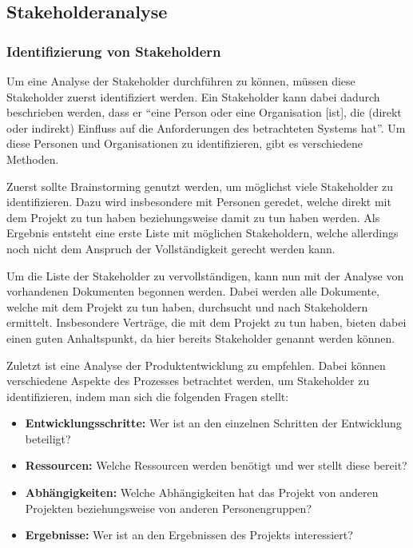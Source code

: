 
\subsection{Stakeholderanalyse}\label{sec:stakeholderanalyse-teil-1}
\subsubsection{Identifizierung von Stakeholdern}
Um eine Analyse der Stakeholder durchführen zu können, müssen diese Stakeholder zuerst identifiziert werden.
Ein Stakeholder kann dabei dadurch beschrieben werden, dass er ``eine Person oder eine Organisation [ist], die (direkt oder indirekt) Einfluss auf die Anforderungen des betrachteten Systems hat''\autocite[Seite 8]{Maulhardt.a}.
Um diese Personen und Organisationen zu identifizieren, gibt es verschiedene Methoden.

Zuerst sollte Brainstorming genutzt werden, um möglichst viele Stakeholder zu identifizieren.
Dazu wird insbesondere mit Personen geredet, welche direkt mit dem Projekt zu tun haben beziehungsweise damit zu tun haben werden.
Als Ergebnis entsteht eine erste Liste mit möglichen Stakeholdern, welche allerdings noch nicht dem Anspruch der Vollständigkeit gerecht werden kann.

Um die Liste der Stakeholder zu vervollständigen, kann nun mit der Analyse von vorhandenen Dokumenten begonnen werden.
Dabei werden alle Dokumente, welche mit dem Projekt zu tun haben, durchsucht und nach Stakeholdern ermittelt.
Insbesondere Verträge, die mit dem Projekt zu tun haben, bieten dabei einen guten Anhaltspunkt, da hier bereits Stakeholder genannt werden können.

Zuletzt ist eine Analyse der Produktentwicklung zu empfehlen.
Dabei können verschiedene Aspekte des Prozesses betrachtet werden, um Stakeholder zu identifizieren, indem man sich die folgenden Fragen stellt:

\begin{itemize}
    \item \textbf{Entwicklungsschritte:} Wer ist an den einzelnen Schritten der Entwicklung beteiligt?
    \item \textbf{Ressourcen:} Welche Ressourcen werden benötigt und wer stellt diese bereit?
    \item \textbf{Abhängigkeiten:} Welche Abhängigkeiten hat das Projekt von anderen Projekten beziehungsweise von anderen Personengruppen?
    \item \textbf{Ergebnisse:} Wer ist an den Ergebnissen des Projekts interessiert?
\end{itemize}


